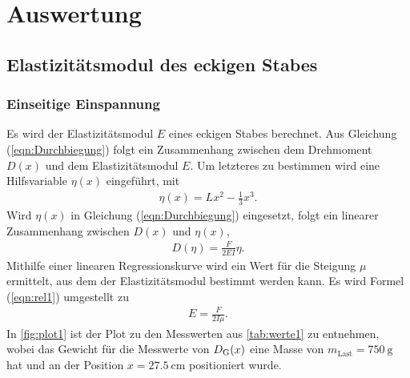 \section{Auswertung}
\label{sec:Auswertung}

\subsection{Elastizitätsmodul des eckigen Stabes}
\label{subsec:elastiEckig}

\subsubsection{Einseitige Einspannung}
\label{subsubsec:einsEck}
Es wird der Elastizitätsmodul $E$ eines eckigen Stabes berechnet.
Aus Gleichung (\ref{eqn:Durchbiegung}) folgt ein Zusammenhang zwischen dem Drehmoment $D(x)$ und dem Elastizitätsmodul $E$. Um letzteres zu bestimmen
wird eine Hilfsvariable $\eta(x)$ eingeführt, mit 
\begin{align}
  \eta(x) = Lx^2- \frac 13 x^3.
  \label{eqn:eta1}
\end{align}
Wird $\eta(x)$ in Gleichung (\ref{eqn:Durchbiegung}) eingesetzt, folgt ein linearer Zusammenhang zwischen $D(x)$ und $\eta(x)$,
\begin{align}
  D(\eta) = \frac{F}{2EI}\eta.
  \label{eqn:rel1}
\end{align}
Mithilfe einer linearen Regressionskurve wird ein Wert für die Steigung $\mu$ ermittelt, aus dem der Elastizitätsmodul bestimmt
werden kann. Es wird Formel (\ref{eqn:rel1}) umgestellt zu
\begin{align}
  E = \frac{F}{2I\mu}.
  \label{eqn:linRegq}
\end{align}
In \autoref{fig:plot1} ist der Plot zu den Messwerten 
aus \autoref{tab:werte1} zu entnehmen, wobei das Gewicht für die Messwerte von $D_{\text G}(x)$ eine Masse von 
$m_{\text{Last}}=\SI{750}{\gram}$ hat und an der Position $x = \SI{27.5}{\centi\meter}$ positioniert wurde.  


